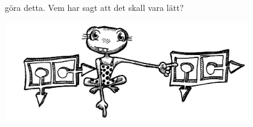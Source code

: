 \documentclass[a6paper,fontsize=10pt,twoside,open=right]{scrbook}
\begin{document}
göra detta. Vem har sagt att det skall vara lätt?
\newpage
\cleardoublepage
\renewcommand{\contentsname}{\vspace{-2.17cm}\rmfamily{\fontsize{13}{15}\textbf{INNEHÅLL}}\vspace{-1.2cm}}
\tableofcontents\par
\vfill
\begin{center}
  \noindent\includegraphics[keepaspectratio,width=0.8\textwidth]{elements/groda.jpg}
\end{center}
\vfill
\renewcommand{\leftmark}{}
\end{document}
